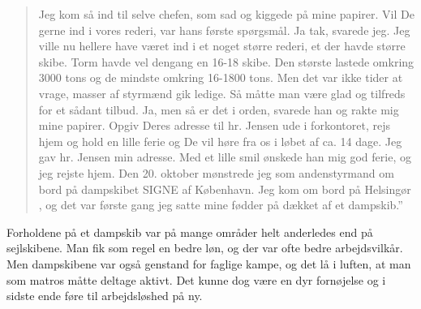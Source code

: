 \begin{quote}
    Jeg kom så ind til selve chefen, som sad og kiggede på mine papirer.
    Vil De gerne ind i vores rederi, var hans første spørgsmål. Ja tak,
    svarede jeg. Jeg ville nu hellere have været ind i et noget større
    rederi, et der havde større skibe. Torm havde vel dengang en 16-18
    skibe. Den største lastede omkring 3000 tons og de mindste omkring
    16-1800 tons. Men det var ikke tider at vrage, masser af styrmænd gik
    ledige. Så måtte man være glad og tilfreds for et sådant tilbud. Ja,
    men så er det i orden, svarede han og rakte mig mine papirer. Opgiv
    Deres adresse til hr. Jensen ude i forkontoret, rejs hjem og hold en
    lille ferie og De vil høre fra os i løbet af ca.  14 dage. Jeg gav
    hr. Jensen min adresse. Med et lille smil ønskede han mig god ferie,
    og jeg rejste hjem. Den 20. oktober mønstrede jeg som andenstyrmand
    om bord på dampskibet SIGNE af København. Jeg kom om bord på
    Helsingør , og det var første gang jeg satte mine
    fødder på dækket af et dampskib.'' 
\end{quote}

Forholdene på et dampskib var på mange områder helt
anderledes end på sejlskibene. Man fik som regel en bedre løn, og der
var ofte bedre arbejdsvilkår. Men dampskibene var også genstand for
faglige kampe, og det lå i luften, at man som matros måtte deltage
aktivt. Det kunne dog være en dyr fornøjelse og i sidste ende føre til
arbejdsløshed på ny. 

